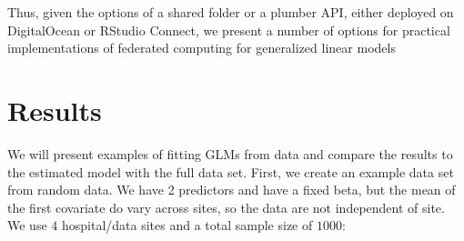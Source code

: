\documentclass[]{elsarticle} %
\begin{document}
Thus, given the options of a shared folder or a plumber API, either deployed on DigitalOcean or RStudio Connect, we present a number of options for practical implementations of federated computing for generalized linear models

\hypertarget{results}{%
\section{Results}\label{results}}

We will present examples of fitting GLMs from data and compare the results to the estimated model with the full data set. First, we create an example data set from random data. We have 2 predictors and have a fixed beta, but the mean of the first covariate do vary across sites, so the data are not independent of site. We use \(4\) hospital/data sites and a total sample size of \(1000\):
\end{document}
